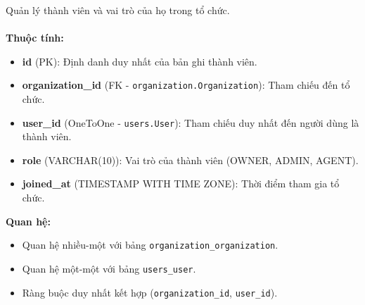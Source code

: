  Quản lý thành viên và vai trò của họ trong tổ chức. \\\\
\indent\textbf{Thuộc tính:}
\begin{itemize}
    \item \textbf{id} (PK): Định danh duy nhất của bản ghi thành viên.
    \item \textbf{organization\_id} (FK - \texttt{organization.Organization}): Tham chiếu đến tổ chức.
    \item \textbf{user\_id} (OneToOne - \texttt{users.User}): Tham chiếu duy nhất đến người dùng là thành viên.
    \item \textbf{role} (VARCHAR(10)): Vai trò của thành viên (OWNER, ADMIN, AGENT).
    \item \textbf{joined\_at} (TIMESTAMP WITH TIME ZONE): Thời điểm tham gia tổ chức.
\end{itemize}
\textbf{Quan hệ:}
\begin{itemize}
    \item Quan hệ nhiều-một với bảng \texttt{organization\_organization}.
    \item Quan hệ một-một với bảng \texttt{users\_user}.
    \item Ràng buộc duy nhất kết hợp (\texttt{organization\_id}, \texttt{user\_id}).
\end{itemize}

